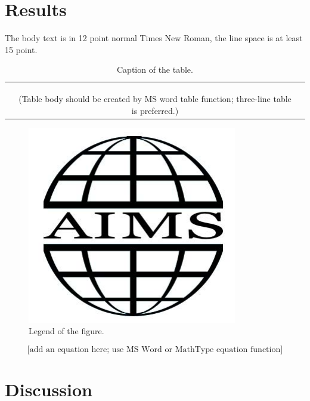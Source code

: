 \documentclass{aims}
\numberwithin{equation}{section}
\begin{document}
\section{Results}
The body text is in 12 point normal Times New Roman, 
the line space is at least 15 point.
 
\begin{table}[H]
\begin{center}
\caption{Caption of the table.}
\begin{tabular}{ccc} \hline
 & & \\\hline
 & & \\
 & & \\
 & & \\\hline
 &(Table body should be created by MS word table function; three-line table is preferred.)
\end{tabular}
\end{center}
\end{table}

\begin{figure}[H]
\begin{center}
\includegraphics[scale=0.8]{figure.pdf}
\caption{Legend of the figure.}
\label{Fig1}
\end{center}
\end{figure}

\begin{equation}
  \text{[add an equation here; use MS Word or MathType equation function]}
\end{equation}

\section{Discussion}
\end{document}
